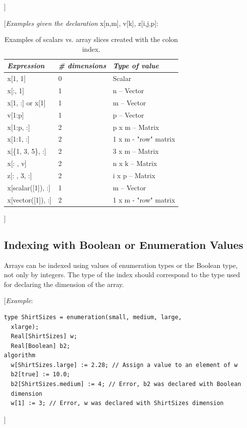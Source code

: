\documentclass[10pt,a4paper]{report}
\def\doublelabel#1{\label{#1}\hypertarget{#1}{}}
\begin{document}
{]}

{[}\emph{Examples given the declaration} x{[}n,m{]}, v{[}k{]}, z{[}i,j,p{]}:

\begin{longtable}[]{|l|l|l|}
\caption{Examples of scalars vs. array slices created with the colon index.}\\
\hline
\emph{Expression} & \emph{\# dimensions} & \emph{Type of value}\\ \hline
\endhead
x{[}1, 1{]} & 0 & Scalar\\ \hline
x{[}:, 1{]} & 1 & n -- Vector\\ \hline
x{[}1, :{]} or x{[}1{]} & 1 & m -- Vector\\ \hline
v{[}1:p{]} & 1 & p -- Vector\\ \hline
x{[}1:p, :{]} & 2 & p x m -- Matrix\\ \hline
x{[}1:1, :{]} & 2 & 1 x m - "row" matrix\\ \hline
x{[}\{1, 3, 5\}, :{]} & 2 & 3 x m -- Matrix\\ \hline
x{[}: , v{]} & 2 & n x k -- Matrix\\ \hline
z{[}: , 3, :{]} & 2 & i x p -- Matrix\\ \hline
x{[}scalar({[}1{]}), :{]} & 1 & m -- Vector\\ \hline
x{[}vector({[}1{]}), :{]} & 2 & 1 x m - "row" matrix\\ \hline

\end{longtable}

{]}

\subsection{Indexing with Boolean or Enumeration Values}\doublelabel{indexing-with-boolean-or-enumeration-values}

Arrays can be indexed using values of enumeration types or the Boolean
type, not only by integers. The type of the index should correspond to
the type used for declaring the dimension of the array.

{[}\emph{Example}:

\begin{lstlisting}[language=modelica]
  type ShirtSizes = enumeration(small, medium, large,
  xlarge);
  Real[ShirtSizes] w;
  Real[Boolean] b2;
algorithm
  w[ShirtSizes.large] := 2.28; // Assign a value to an element of w
  b2[true] := 10.0;
  b2[ShirtSizes.medium] := 4; // Error, b2 was declared with Boolean
  dimension
  w[1] := 3; // Error, w was declared with ShirtSizes dimension
\end{lstlisting}
{]}
\end{document}
